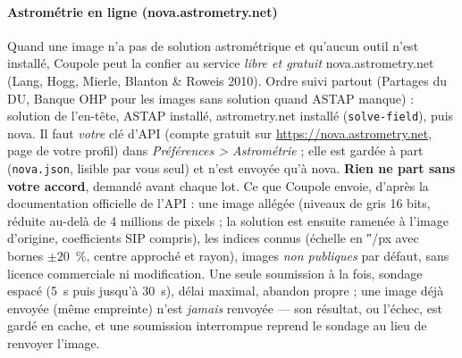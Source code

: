 \paragraph{Astrométrie en ligne (nova.astrometry.net)}\label{sec:nova}
Quand une image n'a pas de solution astrométrique et qu'aucun outil n'est installé, Coupole peut la confier au service
\emph{libre et gratuit} nova.astrometry.net (Lang, Hogg, Mierle, Blanton \& Roweis 2010). Ordre suivi partout (Partages
du DU, Banque OHP pour les images sans solution quand ASTAP manque) : solution de l'en-tête, ASTAP installé,
astrometry.net installé (\texttt{solve-field}), puis nova. Il faut \emph{votre} clé d'API (compte gratuit sur
\url{https://nova.astrometry.net}, page de votre profil) dans \emph{Préférences > Astrométrie} ; elle est gardée à
part (\texttt{nova.json}, lisible par vous seul) et n'est envoyée qu'à nova. \textbf{Rien ne part sans votre accord},
demandé avant chaque lot. Ce que Coupole envoie, d'après la documentation officielle de l'API : une image allégée
(niveaux de gris 16 bits, réduite au-delà de 4 millions de pixels ; la solution est ensuite ramenée à l'image
d'origine, coefficients SIP compris), les indices connus (échelle en ″/px avec bornes $\pm 20$~\%, centre approché et
rayon), images \emph{non publiques} par défaut, sans licence commerciale ni modification. Une seule soumission à la
fois, sondage espacé (5~s puis jusqu'à 30~s), délai maximal, abandon propre ; une image déjà envoyée (même empreinte)
n'est \emph{jamais} renvoyée — son résultat, ou l'échec, est gardé en cache, et une soumission interrompue reprend le
sondage au lieu de renvoyer l'image.

